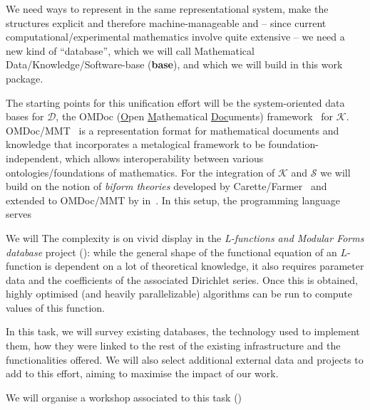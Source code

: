\begin{workpackage}[id=dksbases,%
  title=Data/Knowledge/Software-Bases,lead=JU,
  ZHRM=12,JURM=36,UWRM=25,SARM=10,LLRM=2,PSRM=4]
\begin{wpdescription}
  We need ways to represent \DKS in the same representational system, make the \DKS
  structures explicit and therefore machine-manageable and -- since current
  computational/experimental mathematics involve quite extensive \DKS -- we need a new
  kind of ``database'', which we will call Mathematical Data/Knowledge/Software-base
  (\textbf{\DKS base}), and which we will build in this work package.

  The starting points for this unification effort will be the system-oriented data bases
  for $\mathcal{D}$, the OMDoc (\underline{O}pen \underline{M}athematical
  \underline{Doc}uments) framework~\cite{Kohlhase:OMDoc1.2} for $\mathcal{K}$.
  OMDoc/MMT~\cite{RabKoh:WSMSML13} is a representation format for mathematical documents
  and knowledge that incorporates a metalogical framework to be foundation-independent,
  which allows interoperability between various ontologies/foundations of mathematics. For
  the integration of $\mathcal{K}$ and $\mathcal{S}$ we will build on the notion of
  \emph{biform theories} developed by Carette/Farmer~\cite{btc07} and extended to
  OMDoc/MMT by  in~\cite{KohManRab:aumftg13}. In this setup, the programming
  language serves


 We will  The complexity is on vivid display in the \emph{L-functions and Modular Forms database}
  project (\LMFDB): while the general shape of the functional equation of an $L$-function
  is dependent on a lot of theoretical knowledge, it also requires parameter data and the
  coefficients of the associated Dirichlet series. Once this is obtained, highly optimised
  (and heavily parallelizable) algorithms can be run to compute values of this function.
\end{wpdescription}

\begin{tasklist}
\begin{task}[title={Survey of existing \DKS bases, Formulation of requirements},
  id=data-assessment,lead=ZH,partners={JU,SA,UW,US},wphases=0-3,PM=4]
  In this task, we will survey existing databases, the technology used to implement them,
  how they were linked to the rest of the existing infrastructure and the functionalities
  offered. We will also select additional external data and projects to add to this
  effort, aiming to maximise the impact of our work.

  We will organise a workshop associated to this task ()
\end{task}


\end{tasklist}
\end{workpackage}
